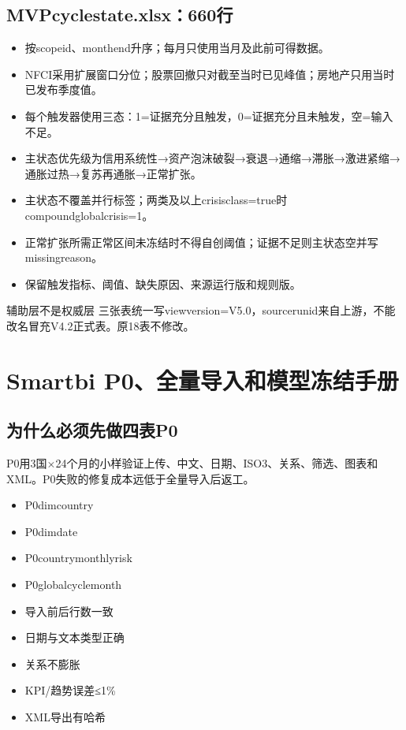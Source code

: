 \documentclass[UTF8,openany,zihao=-4]{ctexbook}
\renewcommand{\_}{\textunderscore\allowbreak}
\begin{document}
\section{MVP\_cycle\_state.xlsx：660行}
\begin{itemize}
\item 按scope\_id、month\_end升序；每月只使用当月及此前可得数据。
\item NFCI采用扩展窗口分位；股票回撤只对截至当时已见峰值；房地产只用当时已发布季度值。
\item 每个触发器使用三态：1=证据充分且触发，0=证据充分且未触发，空=输入不足。
\item 主状态优先级为信用系统性→资产泡沫破裂→衰退→通缩→滞胀→激进紧缩→通胀过热→复苏再通胀→正常扩张。
\item 主状态不覆盖并行标签；两类及以上crisis\_class=true时compound\_global\_crisis=1。
\item 正常扩张所需正常区间未冻结时不得自创阈值；证据不足则主状态空并写missing\_reason。
\item 保留触发指标、阈值、缺失原因、来源运行版和规则版。
\end{itemize}
\begin{gatebox}{辅助层不是权威层}
三张表统一写view\_version=V5.0，source\_run\_id来自上游，不能改名冒充V4.2正式表。原18表不修改。

\end{gatebox}
\chapter{Smartbi P0、全量导入和模型冻结手册}
\section{为什么必须先做四表P0}
P0用3国×24个月的小样验证上传、中文、日期、ISO3、关系、筛选、图表和XML。P0失败的修复成本远低于全量导入后返工。

\begin{itemize}[label=$\square$]
\item P0\_dim\_country
\item P0\_dim\_date
\item P0\_country\_monthly\_risk
\item P0\_global\_cycle\_month
\item 导入前后行数一致
\item 日期与文本类型正确
\item 关系不膨胀
\item KPI/趋势误差≤1\%
\item XML导出有哈希
\end{itemize}
\end{document}
